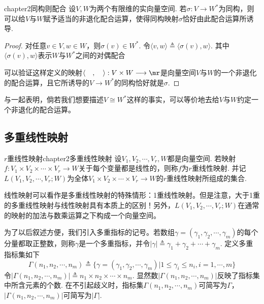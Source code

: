 \begin{mythm}{}{chapter2同构则配合}
	设$V,W$为两个有限维的实向量空间. 若$\sigma:V\longrightarrow W^{\ast}$为同构，则可以给$V$与$W$赋予适当的非退化配合运算，使得同构映射$\sigma$恰好由此配合运算所诱导.
\end{mythm}
\begin{proof}
	对任意$v\in V,w\in W$，则$\sigma(v)\in W^{\ast}$. 令$\langle v,w\rangle\triangleq \langle \sigma(v),w\rangle$. 其中$\langle \sigma(v),w\rangle$表示$W$与$W^{\ast}$之间的对偶配合

	可以验证这样定义的映射$\langle \quad,\quad\rangle: V\times W\longrightarrow \mr$是向量空间$V$与$W$的一个非退化的配合运算，且它所诱导的$V\longrightarrow W^{\ast}$的同构恰好就是$\sigma$. 
\end{proof}

与一起表明，倘若我们想要描述$V\cong W^{\ast}$这样的事实，可以等价地去给$V$与$W$约定一个非退化的配合运算。




\subsection{多重线性映射}\label{多重线性映射}

\begin{mydef}{$r$重线性映射}{chapter2多重线性映射}
	设$V_{1},V_{2},\cdots,V_{r},W$都是向量空间. 若映射$f:V_{1}\times V_{2}\times\cdots\times V_{r}\longrightarrow W$关于每个变量都是线性的，则称$f$为$r$重线性映射. 并记$L(V_{1},V_{2},\cdots,V_{r};W)$为全体$V_{1}\times V_{2}\times\cdots\times V_{r}\longrightarrow W$的$r$重线性映射所组成的集合. 
\end{mydef}

线性映射可以看作是多重线性映射的特殊情形：1重线性映射。但是注意，大于1重的多重线性映射与线性映射具有本质上的区别！另外，$L(V_{1},V_{2},\cdots,V_{r};W)$在通常的映射的加法与数乘运算之下构成一个向量空间。

为了以后叙述方便，我们引入多重指标的记号。若数组$\gamma=(\gamma_{1},\gamma_{2},\cdots,\gamma_{m})$的每个分量都取正整数，则称$\gamma$是一个多重指标，并令$|\gamma|\triangleq\gamma_{1}+\gamma_{2}+\cdots+\gamma_{m}$. 定义多重指标集如下
\[
\Gamma(n_{1},n_{2},\cdots,n_{m})\triangleq \{\gamma=(\gamma_{1},\gamma_{2},\cdots,\gamma_{m}) | 1\leqslant\gamma_{i}\leqslant n_{i},i=1,\cdots,m\}
\]
令$|\Gamma(n_{1},n_{2},\cdots,n_{m})|\triangleq n_{1}\times n_{2}\times\cdots\times n_{m}$. 显然数$|\Gamma(n_{1},n_{2},\cdots,n_{m})|$反映了指标集中所含元素的个数. 在不引起歧义时，指标集$\Gamma(n_{1},n_{2},\cdots,n_{m})$可简写为$\Gamma$，$|\Gamma(n_{1},n_{2},\cdots,n_{m})|$可简写为$|\Gamma|$.

